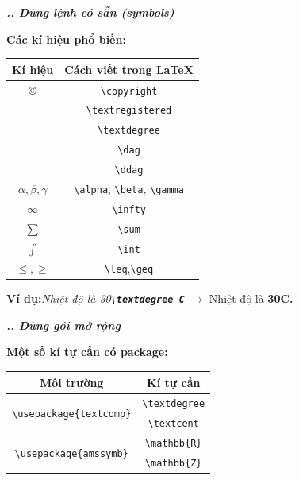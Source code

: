 \documentclass[11pt]{beamer}
\newcounter{group}
\newcommand{\slidenum}{\thegroup.\thesubslide}
\newcounter{subslide}
\begin{document}
	\begin{frame}{\textbf{\textit{\slidenum. Dùng lệnh có sẵn (symbols)}}}
		\begin{block}{\textbf{Các kí hiệu phổ biến:}}
			\begin{table}[h]
				\begin{tabular}{|c|c|}
					\hline
					\rowcolor{red!80}
					\color{white}\textbf{Kí hiệu} &\color{white}\textbf{Cách viết trong \LaTeX}\\
					\hline
					\copyright & \texttt{\textbackslash copyright}\\
					\hline
					\textregistered & \texttt{\textbackslash textregistered}\\
					\hline
					\textdegree & \texttt{\textbackslash textdegree}\\
					\hline
					\dag & \texttt{\textbackslash dag}\\
					\hline
					\ddag & \texttt{\textbackslash ddag}\\
					\hline
					$\alpha, \beta, \gamma$ & \texttt{\textbackslash alpha}, \texttt{\textbackslash beta}, \texttt{\textbackslash gamma}\\
					\hline
					$\infty$ & \texttt{\textbackslash infty}\\
					\hline
					$\sum$ & \texttt{\textbackslash sum}\\
					\hline
					$\int$ & \texttt{\textbackslash int}\\
					\hline
					$\leq, \geq$ & \texttt{\textbackslash leq},\texttt{\textbackslash geq}\\
					\hline
				\end{tabular}
			\end{table}
		\end{block}
		\textbf{Ví dụ:}\textit{Nhiệt độ là 30\textbf{\texttt{\textbackslash textdegree C}}} $\to$ Nhiệt độ là \textbf{30\textdegree C.}
	\end{frame}
	\begin{frame}{\textbf{\textit{\slidenum. Dùng gói mở rộng}}}
		\begin{block}{\textbf{Một số kí tự cần có package:}}
			\begin{table}[h]
				\begin{tabular}{|c|c|}
					\hline
					\rowcolor{red!80}
					\color{white}\textbf{Môi trường} & \color{white}\textbf{Kí tự cần} \\
					\hline
					\multirow{2}{*}{\texttt{\textbackslash usepackage\{textcomp\}}} & \texttt{\textbackslash textdegree} \\
					\cline{2-2}
					& \texttt{\textbackslash textcent} \\
					\hline
					\multirow{2}{*}{\texttt{\textbackslash usepackage\{amssymb\}}} &
					\texttt{\textbackslash mathbb\{R\}} \\
					\cline{2-2}
					& \texttt{\textbackslash mathbb\{Z\}} \\
					\hline
				\end{tabular}
			\end{table}
		\end{block}
	\end{frame}
\end{document}
